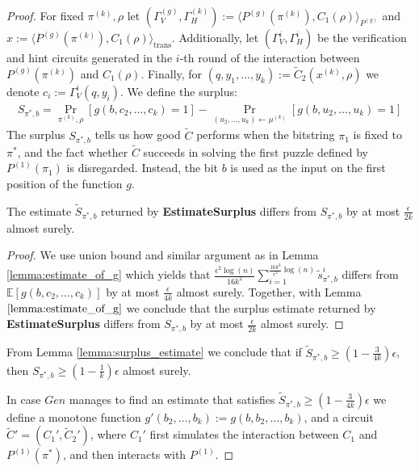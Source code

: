 \begin{proof}
For fixed $\pi^{(k)}, \rho$ let $(\Gamma_V^{(g)}, \Gamma_H^{(k)}) := \langle P^{(g)}(\pi^{(k)}), C_1(\rho) \rangle_{P^{(g)}}$
and $x := \langle P^{(g)}(\pi^{(k)}), C_1(\rho) \rangle_{\text{trans}}$.
Additionally, let $(\Gamma_V^{i}, \Gamma_H^{i})$ be the verification and hint circuits generated in the $i$-th
round of the interaction between $P^{(g)}(\pi^{(k)})$ and $C_1(\rho)$.
Finally, for $(q,y_1, \dots, y_k) := \widetilde{C}_2(x^{(k)}, \rho)$ we denote $c_i := \Gamma_V^i(q,y_i)$.
We define the surplus:
\begin{align}
  \label{eq:s_pi_b}
S_{\pi^*, b} = \underset{\pi^{(k)}, \rho}{\Pr}\left[g(b, c_2, \dots, c_k) = 1\right] - \underset{(u_2, \dots, u_k) \leftarrow \mu^{(k)}}{\Pr}\left[g(b, u_2, \dots, u_k) = 1\right]
\end{align}
%
The surplus $S_{\pi^*, b}$ tells us how good $\widetilde{C}$ performs when the bitstring $\pi_1$ is fixed to $\pi^*$,
and the fact whether $\widetilde{C}$ succeeds in solving the first puzzle defined by $P^{(1)}(\pi_1)$ is disregarded.
Instead, the bit $b$ is used as the input on the first position of the function $g$.

%
\begin{lemma}
  \label{lemma:surplus_estimate}
The estimate $\widetilde{S}_{\pi^*,b}$ returned by \textbf{EstimateSurplus} differs from $S_{\pi^*, b}$ by at most $\frac{\epsilon}{2k}$ almost surely.
\end{lemma}

\begin{proof}
We use union bound and similar argument as in Lemma \ref{lemma:estimate_of_g}
which yields that $\frac{\epsilon^2\log(n)}{16k^2} \sum_{i=1}^{\frac{16k^2}{\epsilon^2}\log(n)} \widetilde{s}_{\pi^*,b}^i$ differs from
$\mathbb{E}[g(b, c_2, \dots, c_k)]$ by at most $\frac{\epsilon}{4k}$ almost surely. Together, with Lemma $\ref{lemma:estimate_of_g}$ we conclude that the surplus estimate
returned by \textbf{EstimateSurplus} differs from $S_{\pi^*,b}$ by at most $\frac{\epsilon}{2k}$ almost surely.
\end{proof}
%
From Lemma \ref{lemma:surplus_estimate} we conclude that if $\widetilde{S}_{\pi^*,b} \geq (1-\frac{3}{4k})\epsilon$, then $S_{\pi^*,b} \geq (1-\frac{1}{k})\epsilon$ almost surely.

In case $Gen$ manages to find an estimate that satisfies $\widetilde{S}_{\pi^*,b} \geq (1-\frac{3}{4k})\epsilon$
we define a monotone function $g'(b_2, \dots, b_k) := g(b, b_2, \dots, b_k)$,
and a circuit $\widetilde{C}' = (C_1', \widetilde{C}_2')$, where
$C_1'$ first simulates the interaction between $C_1$ and $P^{(1)}(\pi^*)$, and then interacts with $P^{(1)}$.


\end{proof}
